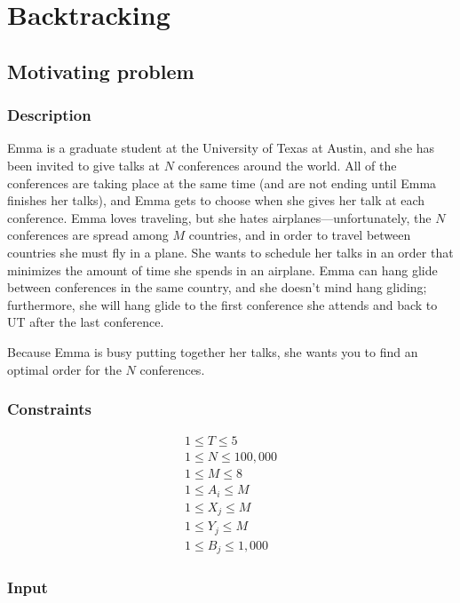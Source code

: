 \section{Backtracking}

\subsection*{Motivating problem}

\subsubsection*{Description}

Emma is a graduate student at the University of Texas at Austin, and she has been invited to give talks at $N$ conferences around the world. All of the conferences are taking place at the same time (and are not ending until Emma finishes her talks), and Emma gets to choose when she gives her talk at each conference. Emma loves traveling, but she hates airplanes---unfortunately, the $N$ conferences are spread among $M$ countries, and in order to travel between countries she must fly in a plane. She wants to schedule her talks in an order that minimizes the amount of time she spends in an airplane. Emma can hang glide between conferences in the same country, and she doesn't mind hang gliding; furthermore, she will hang glide to the first conference she attends and back to UT after the last conference.

Because Emma is busy putting together her talks, she wants you to find an optimal order for the $N$ conferences.

\subsubsection*{Constraints}

\begin{gather*}
1 \leq T \leq 5 \\
1 \leq N \leq 100,000 \\
1 \leq M \leq 8 \\
1 \leq A_i \leq M \\
1 \leq X_j \leq M \\
1 \leq Y_j \leq M \\
1 \leq B_j \leq 1,000
\end{gather*}

\subsubsection*{Input}

